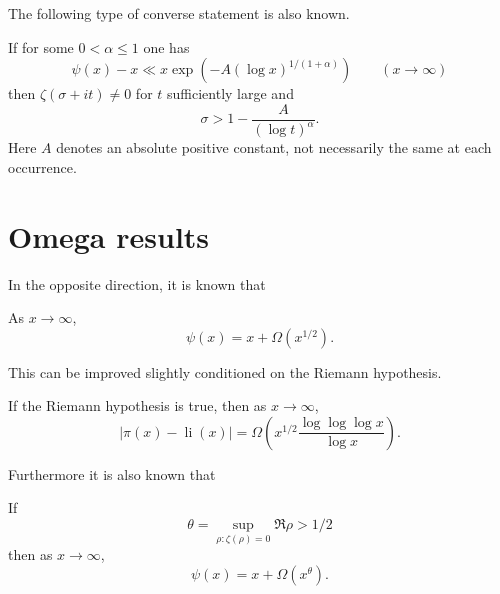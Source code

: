 The following type of converse statement is also known.

\begin{theorem} If for some $0 < \alpha \le 1$ one has
\[
\psi(x) - x \ll x \exp(-A(\log x)^{1/(1 + \alpha)})\qquad (x \to \infty)
\]
then $\zeta(\sigma + it) \ne 0$ for $t$ sufficiently large and
\[
\sigma > 1 - \frac{A}{(\log t)^{\alpha}}.
\]
Here $A$ denotes an absolute positive constant, not necessarily the same at each occurrence. 
\end{theorem}


\section{Omega results}

In the opposite direction, it is known that 
\begin{theorem}
As $x \to \infty$,
\[
\psi(x) = x + \Omega(x^{1/2}).
\]
\end{theorem}
This can be improved slightly conditioned on the Riemann hypothesis.
\begin{theorem}
If the Riemann hypothesis is true, then as $x \to \infty$,
\[
|\pi(x) - \operatorname{li}(x)| = \Omega\left(x^{1/2}\frac{\log\log\log x}{\log x}\right).
\]
\end{theorem}

Furthermore it is also known that
\begin{theorem}
If 
\[
\theta = \sup_{\rho: \zeta(\rho) = 0}\Re \rho > 1/2
\]
then as $x \to \infty$,
\[
\psi(x) = x + \Omega(x^{\theta}).
\]
\end{theorem}


